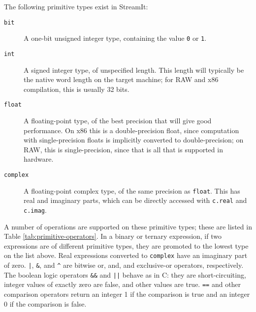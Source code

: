 \documentclass[11pt]{article}
\begin{document}
The following primitive types exist in StreamIt:

\begin{description}
\item[\lstinline|bit|]  A one-bit unsigned integer type, containing
  the value \lstinline|0| or \lstinline|1|.

\item[\lstinline|int|]  A signed integer type, of unspecified length.
  This length will typically be the native word length on the target
  machine; for RAW and x86 compilation, this is usually 32 bits.

\item[\lstinline|float|]  A floating-point type, of the best precision
  that will give good performance.  On x86 this is a double-precision
  float, since computation with single-precision floats is implicitly
  converted to double-precision; on RAW, this is single-precision,
  since that is all that is supported in hardware.

\item[\lstinline|complex|]  A floating-point complex type, of the same
  precision as \lstinline|float|.  This has real and imaginary parts,
  which can be directly accessed with \lstinline|c.real| and
  \lstinline|c.imag|.
\end{description}

\label{sec:operators}
A number of operations are supported on these primitive types; these
are listed in Table \ref{tab:primitive-operators}.  In a binary or
ternary expression, if two expressions are of different primitive
types, they are promoted to the lowest type on the list above.  Real
expressions converted to \lstinline|complex| have an imaginary part of
zero.  \lstinline/|/, \lstinline|&|, and \lstinline|^| are bitwise or,
and, and exclusive-or operators, respectively.  The boolean logic
operators \lstinline|&&| and \lstinline/||/ behave as in C: they are
short-circuiting, integer values of exactly zero are false, and other
values are true.  \lstinline|==| and other comparison operators return
an integer 1 if the comparison is true and an integer 0 if the
comparison is false.
\end{document}
